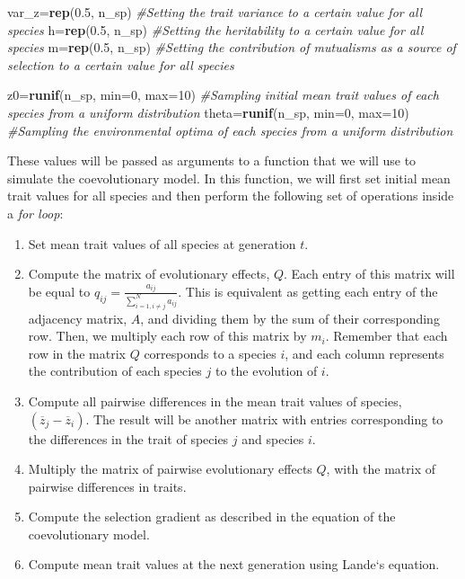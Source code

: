 \documentclass[
]{book}
\newenvironment{Shaded}{\begin{snugshade}}{\end{snugshade}}
\newcommand{\AttributeTok}[1]{\textcolor[rgb]{0.13,0.29,0.53}{#1}}
\newcommand{\CommentTok}[1]{\textcolor[rgb]{0.56,0.35,0.01}{\textit{#1}}}
\newcommand{\DecValTok}[1]{\textcolor[rgb]{0.00,0.00,0.81}{#1}}
\newcommand{\FloatTok}[1]{\textcolor[rgb]{0.00,0.00,0.81}{#1}}
\newcommand{\FunctionTok}[1]{\textcolor[rgb]{0.13,0.29,0.53}{\textbf{#1}}}
\newcommand{\NormalTok}[1]{#1}
\newcommand{\OtherTok}[1]{\textcolor[rgb]{0.56,0.35,0.01}{#1}}
\begin{document}
\begin{Shaded}
\begin{Highlighting}[]
\NormalTok{var\_z}\OtherTok{=}\FunctionTok{rep}\NormalTok{(}\FloatTok{0.5}\NormalTok{, n\_sp) }\CommentTok{\#Setting the trait variance to a certain value for all species}
\NormalTok{h}\OtherTok{=}\FunctionTok{rep}\NormalTok{(}\FloatTok{0.5}\NormalTok{, n\_sp) }\CommentTok{\#Setting the heritability to a certain value for all species}
\NormalTok{m}\OtherTok{=}\FunctionTok{rep}\NormalTok{(}\FloatTok{0.5}\NormalTok{, n\_sp) }\CommentTok{\#Setting the contribution of mutualisms as a source of selection to a certain value for all species}

\NormalTok{z0}\OtherTok{=}\FunctionTok{runif}\NormalTok{(n\_sp, }\AttributeTok{min=}\DecValTok{0}\NormalTok{, }\AttributeTok{max=}\DecValTok{10}\NormalTok{) }\CommentTok{\#Sampling initial mean trait values of each species from a uniform distribution}
\NormalTok{theta}\OtherTok{=}\FunctionTok{runif}\NormalTok{(n\_sp, }\AttributeTok{min=}\DecValTok{0}\NormalTok{, }\AttributeTok{max=}\DecValTok{10}\NormalTok{) }\CommentTok{\#Sampling the environmental optima of each species from a uniform distribution}
\end{Highlighting}
\end{Shaded}

These values will be passed as arguments to a function that we will use to simulate the coevolutionary model. In this function, we will first set initial mean trait values for all species and then perform the following set of operations inside a \emph{for loop}:

\begin{enumerate}
\def\labelenumi{\arabic{enumi}.}
\item
  Set mean trait values of all species at generation \(t\).
\item
  Compute the matrix of evolutionary effects, \(Q\). Each entry of this matrix will be equal to \(q_{ij}=\frac{a_{ij}}{\sum_{i=1, i\neq j}^{N}a_{ij}}\). This is equivalent as getting each entry of the adjacency matrix, \(A\), and dividing them by the sum of their corresponding row. Then, we multiply each row of this matrix by \(m_{i}\). Remember that each row in the matrix \(Q\) corresponds to a species \(i\), and each column represents the contribution of each species \(j\) to the evolution of \(i\).
\item
  Compute all pairwise differences in the mean trait values of species, \((\overline{z}_j-\overline{z}_i)\). The result will be another matrix with entries corresponding to the differences in the trait of species \(j\) and species \(i\).
\item
  Multiply the matrix of pairwise evolutionary effects \(Q\), with the matrix of pairwise differences in traits.
\item
  Compute the selection gradient as described in the equation of the coevolutionary model.
\item
  Compute mean trait values at the next generation using Lande`s equation.
\end{enumerate}
\end{document}
